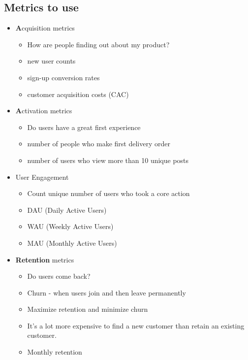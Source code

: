 \documentclass{article}
\begin{document}
\begin{multicols*}{2}
    \section{Metrics to use}
    \renewcommand\labelitemi{{\boldmath$\cdot$}}
    \begin{itemize}[noitemsep]
        \item \textbf{A}cquisition metrics
        \begin{itemize}
            \item How are people finding out about my product?
            \item new user counts 
            \item sign-up conversion rates 
            \item customer acquisition costs (CAC)
        \end{itemize}
        \item \textbf{A}ctivation metrics 
        \begin{itemize}
            \item Do users have a great first experience
            \item number of people who make first delivery order
            \item number of users who view more than 10 unique posts
        \end{itemize}
        \item User Engagement
        \begin{itemize}
            \item Count unique number of users who took a core action
            \item DAU (Daily Active Users)
            \item WAU (Weekly Active Users)
            \item MAU (Monthly Active Users)
        \end{itemize}
        \item \textbf{Retention} metrics
        \begin{itemize}
            \item Do users come back?
            \item Churn - when users join and then leave permanently
            \item Maximize retention and minimize churn
            \item It's a lot more expensive to find a new customer than 
            retain an existing customer.
            \item Monthly retention

\end{itemize}
\end{itemize}
\end{multicols*}
\end{document}
